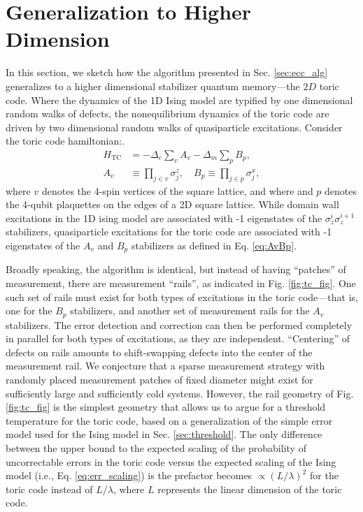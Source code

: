 \documentclass[twocolumn,superscriptaddress,aps,prb,floatfix]{revtex4-1}
\newcommand{\Htc}{H_{\mathrm{TC}}}
\newcommand{\figref}[1]{Fig. \ref{#1}}
\begin{document}
\section{Generalization to Higher Dimension}
\label{sec:tc_alg}

 In this section, we sketch how the algorithm presented in Sec. \ref{sec:ecc_alg} generalizes to a higher dimensional stabilizer quantum memory---the $2D$ toric code.  Where the dynamics of the 1D Ising model are typified by one dimensional random walks of defects, the nonequilibrium dynamics of the toric code are driven by two dimensional random walks of quasiparticle excitations.  Consider the toric code hamiltonian:.
 \begin{align}
\Htc &= -\Delta_e \sum_v A_v -\Delta_m \sum_p B_p ,\label{eq:HTC}\\
A_v &\equiv \prod_{j \in v} \sigma_j^z,\quad B_p \equiv \prod_{j \in p} \sigma_j^x,\label{eq:AvBp}
\end{align}
\noindent
where $v$ denotes the 4-spin vertices of the square lattice, and where and $p$ denotes the 4-qubit plaquettes on the edges of a 2D square lattice\cite{Kitaev2003}.
While domain wall excitations in the 1D ising model are associated with -1 eigenstates of the $\sigma_z^i \sigma_z^{i+1}$ stabilizers, quasiparticle excitations for the toric code are associated with -1 eigenstates of the $A_v$ and $B_p$ stabilizers as defined in Eq. \ref{eq:AvBp}.
 
 Broadly speaking, the algorithm is identical, but instead of having ``patches'' of measurement, there are measurement ``rails'', as indicated in \figref{fig:tc_fig}.  One such set of rails must exist for both types of excitations in the toric code---that is, one for the $B_p$ stabilizers, and another set of measurement rails for the $A_v$ stabilizers.  The error detection and correction can then be performed completely in parallel for both types of excitations, as they are independent.  ``Centering'' of defects on rails amounts to shift-swapping defects into the center of the measurement rail\cite{Freeman2017}.  We conjecture that a sparse measurement strategy with randomly placed measurement patches of fixed diameter might exist for sufficiently large and sufficiently cold systems.  However, the rail geometry of \figref{fig:tc_fig} is the simplest geometry that allows us to argue for a threshold temperature for the toric code, based on a generalization of the simple error model used for the Ising model in Sec. \ref{sec:threshold}.  The only difference between the upper bound to the expected scaling of the probability of uncorrectable errors in the toric code versus the expected scaling of the Ising model (i.e., Eq. \ref{eq:err_scaling}) is the prefactor becomes $\propto (L/\lambda)^2$ for the toric code instead of $L/\lambda$, where $L$ represents the linear dimension of the toric code.
\end{document}
